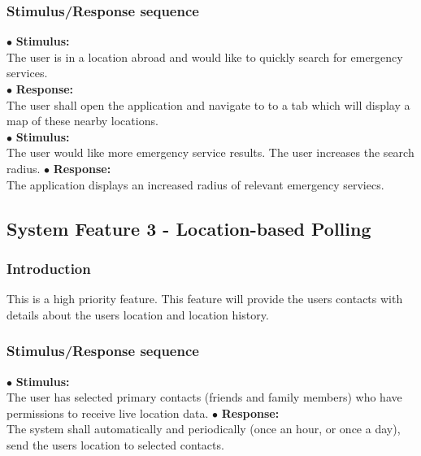 \documentclass{scrreprt}
\begin{document}
\subsubsection{Stimulus/Response sequence}
\vspace{4mm}
	$\bullet$ \textbf{Stimulus:} \\ \hspace{5mm} The user is in a location abroad and would like to quickly search for emergency services. \\
	$\bullet$ \textbf{Response:} \\ \hspace{5mm} The user shall open the application and navigate to to a tab which will display a map of these nearby locations.
\vspace{4mm}\\
	\hspace{-4.75mm} $\bullet$ \textbf{Stimulus:} \\ \hspace{5mm} The user would like more emergency service results. The user increases the search radius.
	$\bullet$ \textbf{Response:} \\ \hspace{5mm} The application displays an increased radius of relevant emergency serviecs.
	
\subsection{System Feature 3 - Location-based Polling}
\subsubsection{Introduction}
This is a high priority feature. This feature will provide the users contacts with details about the users location and location history.


\subsubsection{Stimulus/Response sequence}
\vspace{4mm}
	$\bullet$ \textbf{Stimulus:} \\ \hspace{5mm} The user has selected primary contacts (friends and family members) who have permissions to receive live location data.
	$\bullet$ \textbf{Response:} \\ \hspace{5mm} The system shall automatically and periodically (once an hour, or once a day), send the users location to selected contacts.
\end{document}
